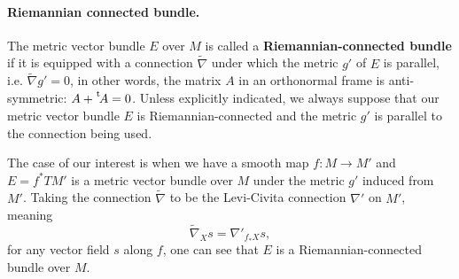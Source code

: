 \paragraph{Riemannian connected bundle.}
\label{sec:org7a462bf}
The metric vector bundle \(E\) over \(M\) is called a \textbf{Riemannian-connected bundle} if
it is equipped with a connection \(\tilde \nabla\) under which the metric \(g'\) of \(E\) is
parallel, i.e. \(\tilde\nabla g' = 0\), in other words, the matrix \(A\) in an
orthonormal frame is anti-symmetric: \(A + \mskip1mu\prescript{\smash{\mathrm t\mkern-3mu}}{}{\mathstrut A} = 0\). Unless explicitly
indicated, we always suppose that our metric vector bundle \(E\) is Riemannian-connected
and the metric \(g'\) is parallel to the connection being used.


\begin{exampl}
\label{ex:pullback-tangent}
The case of our interest is when we have a smooth map \(f: M \longrightarrow M'\) and
\(E = f^*TM'\) is a metric vector bundle over \(M\) under the metric \(g'\) induced
from \(M'\). Taking the connection \(\tilde\nabla\) to be the Levi-Civita connection \(\nabla'\)
on \(M'\), meaning
\[
 \tilde\nabla_X s = \nabla'_{f_*X}s,
\]
for any vector field \(s\) along \(f\), one can see that \(E\) is a
Riemannian-connected bundle over \(M\).
\end{exampl}


